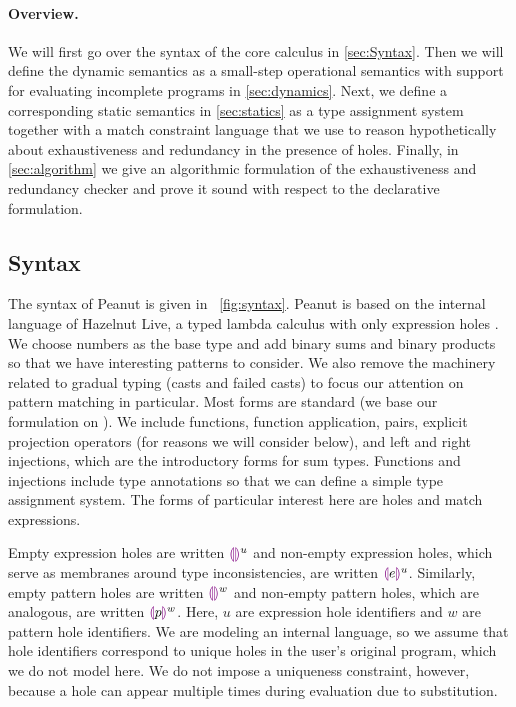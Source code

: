 \documentclass[runningheads,envcountsame,a4paper]{llncs}
\begin{document}
\paragraph{Overview.}
We will first go over the syntax of the core calculus in \autoref{sec:Syntax}. Then we will define the dynamic semantics as a small-step operational semantics with support for evaluating incomplete programs in \autoref{sec:dynamics}. Next, we define a corresponding static
semantics in \autoref{sec:statics} as a type assignment system together with a match constraint language
that we use to reason hypothetically about exhaustiveness and redundancy in the presence of
holes. Finally, in \autoref{sec:algorithm} we give an algorithmic formulation of the exhaustiveness and redundancy checker and prove it sound with respect to the
declarative formulation.

\subsection{Syntax}
\label{sec:Syntax}
The syntax of Peanut is given in \figurename~\ref{fig:syntax}. 
Peanut is based on the internal language of Hazelnut Live, a typed lambda calculus with only expression holes \cite{DBLP:journals/pacmpl/OmarVCH19}.
We choose numbers as the base type and add binary sums and binary products so that we have interesting
patterns to consider. We also remove the machinery related to gradual typing (casts and failed casts) to focus our attention on pattern matching in particular. Most forms are standard (we base our formulation on \cite{Harper2012}). We include functions, function application, pairs, explicit projection operators (for reasons we will consider below), and left and right injections, which are the introductory forms for sum types. Functions and injections include type annotations so that we can define a simple type assignment system. The forms of particular interest here are holes and match expressions.

Empty expression holes are written $\textcolor{violet}{\llparenthesis}\textcolor{violet}{\rrparenthesis}^{u}$ and non-empty expression holes, which serve as membranes around type inconsistencies, are written $\textcolor{violet}{\llparenthesis} e\textcolor{violet}{\rrparenthesis}^{u}$. Similarly, empty pattern holes are written $\textcolor{violet}{\llparenthesis}\textcolor{violet}{\rrparenthesis}^{w}$ and non-empty pattern holes, which are analogous, are written $\textcolor{violet}{\llparenthesis} p\textcolor{violet}{\rrparenthesis}^{w}$. Here, $u$ are expression hole identifiers and $w$ are pattern hole identifiers.
We are modeling an internal language, so we assume that hole identifiers 
correspond to unique holes in the user's original program, which we do not model here. We do not impose a uniqueness constraint, however, because a hole can 
appear multiple times during evaluation due to substitution.
\end{document}
